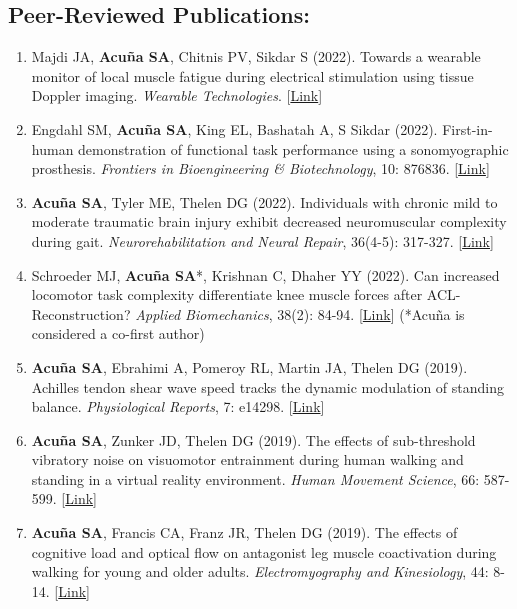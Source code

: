 \documentclass[letterpaper, 10pt]{article}
\begin{document}
\subsection{Peer-Reviewed Publications:}
\begin{enumerate}
    \item Majdi JA, \textbf{Acuña SA}, Chitnis PV, Sikdar S (2022). Towards a wearable monitor of local muscle fatigue during electrical stimulation using tissue Doppler imaging. \textit{Wearable Technologies}. [\href{https://www.cambridge.org/core/journals/wearable-technologies/article/toward-a-wearable-monitor-of-local-muscle-fatigue-during-electrical-muscle-stimulation-using-tissue-doppler-imaging/4ADA49B3A98D245E222D5CCFDE1F180D}{Link}]
    \item Engdahl SM, \textbf{Acuña SA}, King EL, Bashatah A, S Sikdar (2022). First-in-human demonstration of functional task performance using a sonomyographic prosthesis. \textit{Frontiers in Bioengineering \& Biotechnology}, 10: 876836. [\href{https://www.frontiersin.org/articles/10.3389/fbioe.2022.876836/full}{Link}]
    \item \textbf{Acuña SA}, Tyler ME, Thelen DG (2022). Individuals with chronic mild to moderate traumatic brain injury exhibit decreased neuromuscular complexity during gait. \textit{Neurorehabilitation and Neural Repair}, 36(4-5): 317-327. [\href{https://journals.sagepub.com/doi/full/10.1177/15459683221081064}{Link}]
    \item Schroeder MJ, \textbf{Acuña SA}*, Krishnan C, Dhaher YY (2022). Can increased locomotor task complexity differentiate knee muscle forces after ACL-Reconstruction? \textit{Applied Biomechanics}, 38(2): 84-94. [\href{https://journals.humankinetics.com/view/journals/jab/38/2/article-p84.xml}{Link}] (*Acuña is considered a co-ﬁrst author)
    \item \textbf{Acuña SA}, Ebrahimi A, Pomeroy RL, Martin JA, Thelen DG (2019). Achilles tendon shear wave speed tracks the dynamic modulation of standing balance. \textit{Physiological Reports}, 7: e14298. [\href{https://physoc.onlinelibrary.wiley.com/doi/full/10.14814/phy2.14298}{Link}]
    \item \textbf{Acuña SA}, Zunker JD, Thelen DG (2019). The effects of sub-threshold vibratory noise on visuomotor entrainment during human walking and standing in a virtual reality environment. \textit{Human Movement Science}, 66: 587-599. [\href{https://www.sciencedirect.com/science/article/abs/pii/S0167945719300582}{Link}]
    \item \textbf{Acuña SA}, Francis CA, Franz JR, Thelen DG (2019). The effects of cognitive load and optical ﬂow on antagonist leg muscle coactivation during walking for young and older adults. \textit{Electromyography and Kinesiology}, 44: 8-14. [\href{https://www.sciencedirect.com/science/article/abs/pii/S1050641118303122}{Link}]

\end{enumerate}
\end{document}
